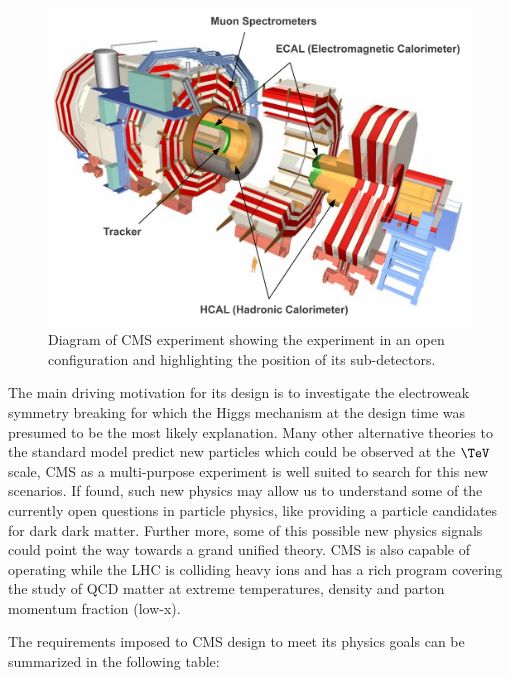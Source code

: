 \begin{figure}[!htb]
  \centering
  \includegraphics[width=1.00\textwidth]{Chapter02/CMS/Images/CMS_Layout_Diagram.pdf}
  \caption{Diagram of \gls{CMS} experiment showing the experiment in an open configuration and highlighting the position of its sub-detectors. \cite{URL:CERNPublic_CMSDiagram}}
  \label{FIGURE:ExperimentalApparatus_CMS_Layout_Diagram}
\end{figure}

The main driving motivation for its design is to investigate the electroweak symmetry breaking for which the Higgs mechanism at the design time was presumed to be the most likely explanation. Many other alternative theories to the standard model predict new particles which could be observed at the $\TeV$ scale, \gls{CMS} as a multi-purpose experiment is well suited to search for this new scenarios. If found, such new physics may allow us to understand some of the currently open questions in particle physics, like providing a particle candidates for dark dark matter. Further more, some of this possible new physics signals could point the way towards a grand unified theory. \gls{CMS} is also capable of operating while the \gls{LHC} is colliding heavy ions and has a rich program covering the study of \gls{QCD} matter at extreme temperatures, density and parton momentum fraction (low-x).

The requirements imposed to \gls{CMS} design to meet its physics goals can be summarized in the following table\cite{ARTICLE:TheCMSExperiment}:

